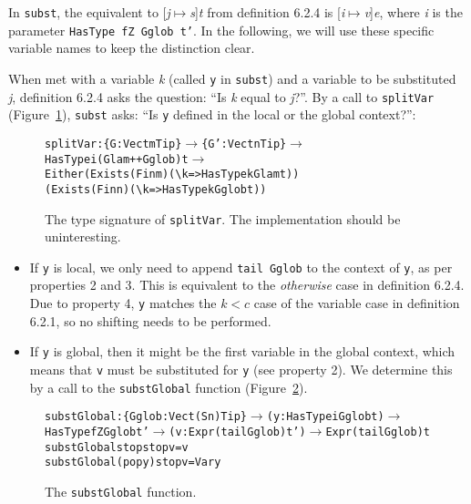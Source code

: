 In \texttt{subst}, the equivalent to [\textit{j}$\mapsto$\textit{s}]\textit{t} from definition 6.2.4 is [\textit{i}$\mapsto$\textit{v}]\textit{e}, where \textit{i} is the parameter \texttt{HasType fZ Gglob t'}. In the following, we will use these specific variable names to keep the distinction clear.

When met with a variable \textit{k} (called \texttt{y} in \texttt{subst}) and a variable to be substituted \textit{j}, definition 6.2.4 asks the question: ``Is \textit{k} equal to \textit{j}?''. By a call to \texttt{splitVar} (Figure~\ref{fig:splitVar}), \texttt{subst} asks: ``Is \texttt{y} defined in the local or the global context?'':

\begin{figure}
\begin{alltt}
splitVar : \{G: Vect m Tip\} \(\rightarrow\) \{G': Vect n Tip\} \(\rightarrow\) HasType i (Glam ++ Gglob) t \(\rightarrow\) 
           Either (Exists (Fin m) (\textbackslash{k} => HasType k Glam t)) 
                  (Exists (Fin n) (\textbackslash{k} => HasType k Gglob t))
\end{alltt}
\caption{The type signature of \texttt{splitVar}. The implementation should be uninteresting.}
\label{fig:splitVar}
\end{figure}

\begin{itemize}
\item If \texttt{y} is local, we only need to append \texttt{tail Gglob} to the context of \texttt{y}, as per properties 2 and 3. This is equivalent to the \textit{otherwise} case in definition 6.2.4. Due to property 4, \texttt{y} matches the $k < c$ case of the variable case in definition 6.2.1, so no shifting needs to be performed.
\item If \texttt{y} is global, then it might be the first variable in the global context, which means that \texttt{v} must be substituted for \texttt{y} (see property 2). We determine this by a call to the \texttt{substGlobal} function (Figure~\ref{fig:substGlobal}).
\end{itemize}

\begin{figure}
\begin{alltt}
    substGlobal : \{Gglob : Vect (S n) Tip\} \(\rightarrow\) (y: HasType i Gglob t) \(\rightarrow\) 
                  HasType fZ Gglob t' \(\rightarrow\) (v: Expr (tail Gglob) t') \(\rightarrow\) Expr (tail Gglob) t
    substGlobal stop    stop v = v
    substGlobal (pop y) stop v = Var y
\end{alltt}
\caption{The \texttt{substGlobal} function.}
\label{fig:substGlobal}
\end{figure}

